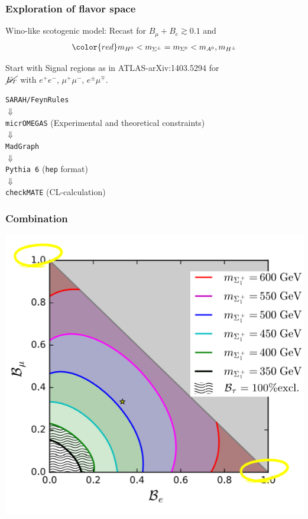 \documentclass[%
xcolor=dvipsnames,table%
]{beamer}
\begin{document}
\begin{frame}
  \frametitle{Exploration of flavor space}
\alert{Wino-like scotogenic model}: Recast for \alert{$B_{\mu}+B_e \gtrsim 0.1$} and
\begin{align*}
\color{red}  m_{H^0}<m_{\Sigma^{\pm}}= m_{\Sigma^{0}}<m_{A^0},m_{H^{\pm}}
\end{align*}

\vspace{-0.3cm}

Start with Signal regions as in ATLAS-arXiv:1403.5294 for\\


 $\cancel{E_T}$ with $e^+ e^-$, $\mu^+\mu^-$,
 $e^{\pm}\mu^{\mp}$. 

\centering
\texttt{SARAH/FeynRules} \\
$\Downarrow$\\
\texttt{micrOMEGAS} (Experimental and theoretical constraints) \\
$\Downarrow$\\
\texttt{MadGraph}\\
$\Downarrow$\\
\texttt{Pythia 6} (\texttt{hep} format)\\ 
$\Downarrow$\\
\texttt{checkMATE} (CL-calculation)
\end{frame}



\begin{frame}
  \frametitle{Combination}
  \includegraphics[scale=0.54]{clcomb}
\end{frame}
\end{document}
